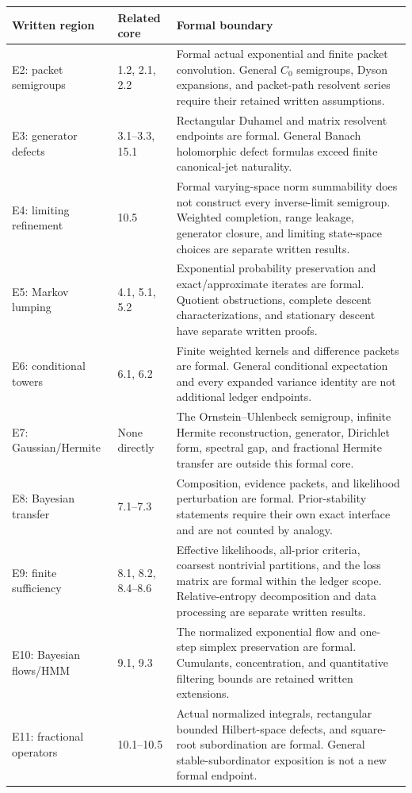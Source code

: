 \begin{longtable}{@{}p{.24\linewidth}p{.18\linewidth}p{.51\linewidth}@{}}
\toprule Written region & Related core & Formal boundary\\\midrule\endhead
E2: packet semigroups & 1.2, 2.1, 2.2 & Formal actual exponential and finite packet convolution. General $C_0$ semigroups, Dyson expansions, and packet-path resolvent series require their retained written assumptions.\\
E3: generator defects & 3.1--3.3, 15.1 & Rectangular Duhamel and matrix resolvent endpoints are formal. General Banach holomorphic defect formulas exceed finite canonical-jet naturality.\\
E4: limiting refinement & 10.5 & Formal varying-space norm summability does not construct every inverse-limit semigroup. Weighted completion, range leakage, generator closure, and limiting state-space choices are separate written results.\\
E5: Markov lumping & 4.1, 5.1, 5.2 & Exponential probability preservation and exact/approximate iterates are formal. Quotient obstructions, complete descent characterizations, and stationary descent have separate written proofs.\\
E6: conditional towers & 6.1, 6.2 & Finite weighted kernels and difference packets are formal. General conditional expectation and every expanded variance identity are not additional ledger endpoints.\\
E7: Gaussian/Hermite & None directly & The Ornstein--Uhlenbeck semigroup, infinite Hermite reconstruction, generator, Dirichlet form, spectral gap, and fractional Hermite transfer are outside this formal core.\\
E8: Bayesian transfer & 7.1--7.3 & Composition, evidence packets, and likelihood perturbation are formal. Prior-stability statements require their own exact interface and are not counted by analogy.\\
E9: finite sufficiency & 8.1, 8.2, 8.4--8.6 & Effective likelihoods, all-prior criteria, coarsest nontrivial partitions, and the loss matrix are formal within the ledger scope. Relative-entropy decomposition and data processing are separate written results.\\
E10: Bayesian flows/HMM & 9.1, 9.3 & The normalized exponential flow and one-step simplex preservation are formal. Cumulants, concentration, and quantitative filtering bounds are retained written extensions.\\
E11: fractional operators & 10.1--10.5 & Actual normalized integrals, rectangular bounded Hilbert-space defects, and square-root subordination are formal. General stable-subordinator exposition is not a new formal endpoint.\\

\end{longtable}
